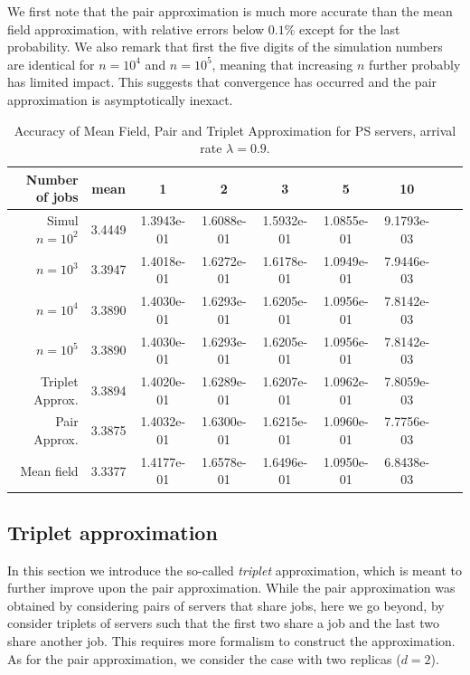 \documentclass[acmsmall,nonacm]{acmart}
\begin{document}
We first note that the pair approximation is much more accurate than
the mean field approximation, with relative errors below $0.1\%$ except for the last probability.
We also remark that first the five digits of the simulation numbers are identical for $n=10^4$ and $n=10^5$, meaning that increasing $n$ further probably has limited impact. This suggests that convergence has occurred and the pair
approximation is asymptotically inexact. 
\begin{table}[t]
    \centering
    \begin{tabular}{|r|c|c|c|c|c|c|c|c|}
    \hline 
Number of jobs & mean & 1 & 2 & 3 & 5 & 10\\ \hline
\hline 
Simul $n=10^2$ &3.4449  & 1.3943e-01 &  1.6088e-01  & 1.5932e-01  & 1.0855e-01  & 9.1793e-03 \\
 $n=10^3$&   3.3947 &  1.4018e-01 &  1.6272e-01 &  1.6178e-01 &  1.0949e-01  & 7.9446e-03\\
 $n=10^4$ &   3.3890 &  1.4030e-01 &  1.6293e-01  & 1.6205e-01 &  1.0956e-01  & 7.8142e-03\\
 $n=10^5$&   3.3890 &  1.4030e-01 &  1.6293e-01  & 1.6205e-01 &  1.0956e-01  & 7.8142e-03\\
\hline
Triplet Approx. & 3.3894 &   1.4020e-01  & 1.6289e-01 &  1.6207e-01 &  1.0962e-01 &  7.8059e-03 \\\hline
Pair Approx. &   3.3875 &  1.4032e-01 &  1.6300e-01  & 1.6215e-01 &  1.0960e-01  & 7.7756e-03\\
\hline
Mean field &   3.3377 &  1.4177e-01 &  1.6578e-01  & 1.6496e-01 &  1.0950e-01  & 6.8438e-03\\
         \hline
    \end{tabular}
    \caption{Accuracy of Mean Field, Pair and Triplet Approximation for PS servers, arrival rate $\lambda=0.9$. }
    \label{tab:simulPAIR09}
\end{table}




\subsection{Triplet approximation}\label{sec:triplet}
In this section we introduce the so-called {\it triplet} approximation, which is meant to further improve upon the pair approximation. While the pair approximation was obtained by considering pairs of servers that share jobs, here we go beyond, by consider triplets of servers such that the first two share a job and the last two share another job. This requires more formalism to construct the approximation.  As for the pair approximation, we consider the case with two replicas ($d=2$).
\end{document}
